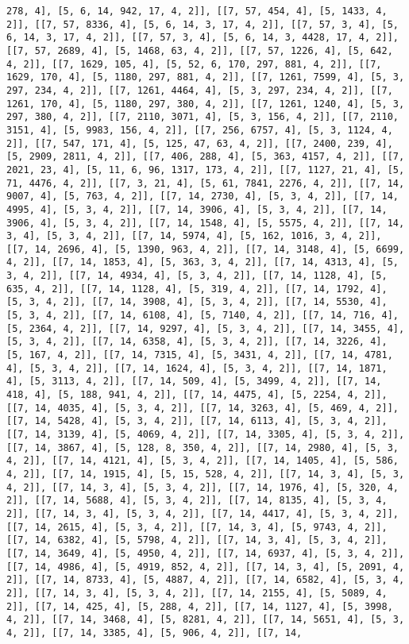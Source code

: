 \documentclass[12pt,fleqn]{article}\usepackage{../../common}
\begin{document}
\begin{verbatim}
278, 4], [5, 6, 14, 942, 17, 4, 2]], [[7, 57, 454, 4], [5, 1433, 4, 2]], [[7, 57, 8336, 4], [5, 6, 14, 3, 17, 4, 2]], [[7, 57, 3, 4], [5, 6, 14, 3, 17, 4, 2]], [[7, 57, 3, 4], [5, 6, 14, 3, 4428, 17, 4, 2]], [[7, 57, 2689, 4], [5, 1468, 63, 4, 2]], [[7, 57, 1226, 4], [5, 642, 4, 2]], [[7, 1629, 105, 4], [5, 52, 6, 170, 297, 881, 4, 2]], [[7, 1629, 170, 4], [5, 1180, 297, 881, 4, 2]], [[7, 1261, 7599, 4], [5, 3, 297, 234, 4, 2]], [[7, 1261, 4464, 4], [5, 3, 297, 234, 4, 2]], [[7, 1261, 170, 4], [5, 1180, 297, 380, 4, 2]], [[7, 1261, 1240, 4], [5, 3, 297, 380, 4, 2]], [[7, 2110, 3071, 4], [5, 3, 156, 4, 2]], [[7, 2110, 3151, 4], [5, 9983, 156, 4, 2]], [[7, 256, 6757, 4], [5, 3, 1124, 4, 2]], [[7, 547, 171, 4], [5, 125, 47, 63, 4, 2]], [[7, 2400, 239, 4], [5, 2909, 2811, 4, 2]], [[7, 406, 288, 4], [5, 363, 4157, 4, 2]], [[7, 2021, 23, 4], [5, 11, 6, 96, 1317, 173, 4, 2]], [[7, 1127, 21, 4], [5, 71, 4476, 4, 2]], [[7, 3, 21, 4], [5, 61, 7841, 2276, 4, 2]], [[7, 14, 9007, 4], [5, 763, 4, 2]], [[7, 14, 2730, 4], [5, 3, 4, 2]], [[7, 14, 4995, 4], [5, 3, 4, 2]], [[7, 14, 3906, 4], [5, 3, 4, 2]], [[7, 14, 3906, 4], [5, 3, 4, 2]], [[7, 14, 1548, 4], [5, 5575, 4, 2]], [[7, 14, 3, 4], [5, 3, 4, 2]], [[7, 14, 5974, 4], [5, 162, 1016, 3, 4, 2]], [[7, 14, 2696, 4], [5, 1390, 963, 4, 2]], [[7, 14, 3148, 4], [5, 6699, 4, 2]], [[7, 14, 1853, 4], [5, 363, 3, 4, 2]], [[7, 14, 4313, 4], [5, 3, 4, 2]], [[7, 14, 4934, 4], [5, 3, 4, 2]], [[7, 14, 1128, 4], [5, 635, 4, 2]], [[7, 14, 1128, 4], [5, 319, 4, 2]], [[7, 14, 1792, 4], [5, 3, 4, 2]], [[7, 14, 3908, 4], [5, 3, 4, 2]], [[7, 14, 5530, 4], [5, 3, 4, 2]], [[7, 14, 6108, 4], [5, 7140, 4, 2]], [[7, 14, 716, 4], [5, 2364, 4, 2]], [[7, 14, 9297, 4], [5, 3, 4, 2]], [[7, 14, 3455, 4], [5, 3, 4, 2]], [[7, 14, 6358, 4], [5, 3, 4, 2]], [[7, 14, 3226, 4], [5, 167, 4, 2]], [[7, 14, 7315, 4], [5, 3431, 4, 2]], [[7, 14, 4781, 4], [5, 3, 4, 2]], [[7, 14, 1624, 4], [5, 3, 4, 2]], [[7, 14, 1871, 4], [5, 3113, 4, 2]], [[7, 14, 509, 4], [5, 3499, 4, 2]], [[7, 14, 418, 4], [5, 188, 941, 4, 2]], [[7, 14, 4475, 4], [5, 2254, 4, 2]], [[7, 14, 4035, 4], [5, 3, 4, 2]], [[7, 14, 3263, 4], [5, 469, 4, 2]], [[7, 14, 5428, 4], [5, 3, 4, 2]], [[7, 14, 6113, 4], [5, 3, 4, 2]], [[7, 14, 3139, 4], [5, 4069, 4, 2]], [[7, 14, 3305, 4], [5, 3, 4, 2]], [[7, 14, 3867, 4], [5, 128, 8, 350, 4, 2]], [[7, 14, 2980, 4], [5, 3, 4, 2]], [[7, 14, 4121, 4], [5, 3, 4, 2]], [[7, 14, 1405, 4], [5, 586, 4, 2]], [[7, 14, 1915, 4], [5, 15, 528, 4, 2]], [[7, 14, 3, 4], [5, 3, 4, 2]], [[7, 14, 3, 4], [5, 3, 4, 2]], [[7, 14, 1976, 4], [5, 320, 4, 2]], [[7, 14, 5688, 4], [5, 3, 4, 2]], [[7, 14, 8135, 4], [5, 3, 4, 2]], [[7, 14, 3, 4], [5, 3, 4, 2]], [[7, 14, 4417, 4], [5, 3, 4, 2]], [[7, 14, 2615, 4], [5, 3, 4, 2]], [[7, 14, 3, 4], [5, 9743, 4, 2]], [[7, 14, 6382, 4], [5, 5798, 4, 2]], [[7, 14, 3, 4], [5, 3, 4, 2]], [[7, 14, 3649, 4], [5, 4950, 4, 2]], [[7, 14, 6937, 4], [5, 3, 4, 2]], [[7, 14, 4986, 4], [5, 4919, 852, 4, 2]], [[7, 14, 3, 4], [5, 2091, 4, 2]], [[7, 14, 8733, 4], [5, 4887, 4, 2]], [[7, 14, 6582, 4], [5, 3, 4, 2]], [[7, 14, 3, 4], [5, 3, 4, 2]], [[7, 14, 2155, 4], [5, 5089, 4, 2]], [[7, 14, 425, 4], [5, 288, 4, 2]], [[7, 14, 1127, 4], [5, 3998, 4, 2]], [[7, 14, 3468, 4], [5, 8281, 4, 2]], [[7, 14, 5651, 4], [5, 3, 4, 2]], [[7, 14, 3385, 4], [5, 906, 4, 2]], [[7, 14, 
\end{verbatim}
\end{document}
